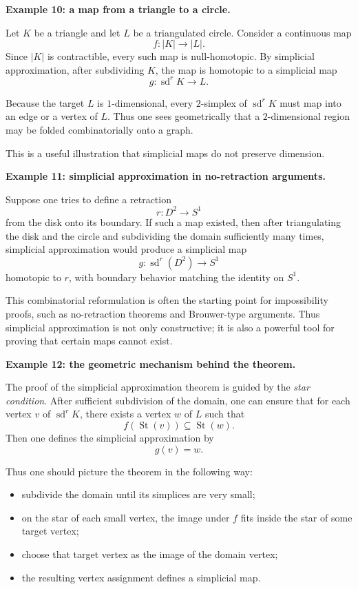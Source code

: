 \documentclass[12pt,a4paper]{article}
\theoremstyle{notespace}
\begin{document}
\medskip

\textbf{Example 10: a map from a triangle to a circle.}

Let \(K\) be a triangle and let \(L\) be a triangulated circle. Consider a continuous map
\[
f:|K|\to |L|.
\]
Since \(|K|\) is contractible, every such map is null-homotopic. By simplicial approximation, after subdividing \(K\), the map is homotopic to a simplicial map
\[
g:\operatorname{sd}^r K \to L.
\]

Because the target \(L\) is \(1\)-dimensional, every \(2\)-simplex of \(\operatorname{sd}^r K\) must map into an edge or a vertex of \(L\). Thus one sees geometrically that a \(2\)-dimensional region may be folded combinatorially onto a graph.

This is a useful illustration that simplicial maps do not preserve dimension.

\medskip

\textbf{Example 11: simplicial approximation in no-retraction arguments.}

Suppose one tries to define a retraction
\[
r:D^2\to S^1
\]
from the disk onto its boundary. If such a map existed, then after triangulating the disk and the circle and subdividing the domain sufficiently many times, simplicial approximation would produce a simplicial map
\[
g:\operatorname{sd}^r(D^2)\to S^1
\]
homotopic to \(r\), with boundary behavior matching the identity on \(S^1\).

This combinatorial reformulation is often the starting point for impossibility proofs, such as no-retraction theorems and Brouwer-type arguments. Thus simplicial approximation is not only constructive; it is also a powerful tool for proving that certain maps cannot exist.

\medskip

\textbf{Example 12: the geometric mechanism behind the theorem.}

The proof of the simplicial approximation theorem is guided by the \emph{star condition}. After sufficient subdivision of the domain, one can ensure that for each vertex \(v\) of \(\operatorname{sd}^r K\), there exists a vertex \(w\) of \(L\) such that
\[
f(\operatorname{St}(v))\subseteq \operatorname{St}(w).
\]
Then one defines the simplicial approximation by
\[
g(v)=w.
\]

Thus one should picture the theorem in the following way:

\begin{itemize}
	\item subdivide the domain until its simplices are very small;
	\item on the star of each small vertex, the image under \(f\) fits inside the star of some target vertex;
	\item choose that target vertex as the image of the domain vertex;
	\item the resulting vertex assignment defines a simplicial map.
\end{itemize}
\end{document}
